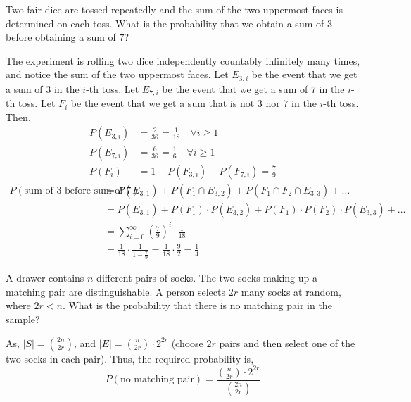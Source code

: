\begin{example}
    Two fair dice are tossed repeatedly and the sum of the two uppermost faces
is determined on each toss. What is the probability that we obtain a sum of $3$
before obtaining a sum of $7$?
\end{example}
\begin{solution}
    The experiment is rolling two dice independently countably infinitely many
times, and notice the sum of the two uppermost faces. Let $E_{3, i}$ be the
event that we get a sum of $3$ in the $i$-th toss. Let $E_{7, i}$ be the event
that we get a sum of $7$ in the $i$-th toss. Let $F_i$ be the event that we get
a sum that is not $3$ nor $7$ in the $i$-th toss. Then, 
\begin{align*}
    P(E_{3, i}) &= \frac{2}{36} = \frac{1}{18} \quad \forall i \geq 1        \\
    P(E_{7, i}) &= \frac{6}{36} = \frac{1}{6}  \quad \forall i \geq 1        \\
    P(F_i)     &= 1 - P(F_{3, i}) - P(F_{7, i}) = \frac{7}{9}
\end{align*}
\begin{align*}
       P(\text{sum of $3$ before sum of $7$})
    &= P(E_{3, 1}) + P(F_1 \cap E_{3, 2}) + P(F_1 \cap F_2 \cap E_{3, 3}) +
       \dots                                                                 \\
    &= P(E_{3, 1}) + P(F_1) \cdot P(E_{3, 2}) + P(F_1) \cdot P(F_2) \cdot
       P(E_{3, 3}) + \dots                                                   \\
    &= \sum_{i = 0}^\infty (\frac{7}{9})^i \cdot \frac{1}{18}                \\
    &= \frac{1}{18} \cdot \frac{1}{1 - \frac{7}{9}}
     = \frac{1}{18} \cdot \frac{9}{2}
     = \frac{1}{4}
\end{align*}
\end{solution}

\begin{example}
    A drawer contains $n$ different pairs of socks. The two socks making up a
matching pair are distinguishable. A person selects $2r$ many socks at random,
where $2r < n$. What is the probability that there is no matching pair in the
sample?
\end{example}
\begin{solution}
    As, $\vert S \vert = {{2n} \choose {2r}}$, and $\vert E \vert = {{n}
\choose {2r}} \cdot 2^{2r}$ (choose $2r$ pairs and then select one of the two
socks in each pair). Thus, the required probability is,
\begin{equation*}
       P(\text{no matching pair})
    = \frac{{{n} \choose {2r}} \cdot 2^{2r}}{{{2n} \choose {2r}}}
\end{equation*}
\end{solution}

